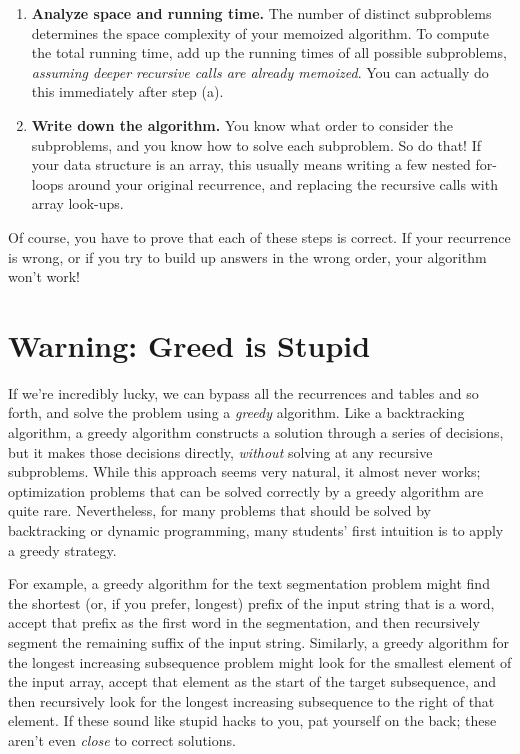 \begin{enumerate}
\begin{enumerate}
The dependencies you identified in the previous step define a partial order over the subproblems; you need to find a linear extension of that partial order.
\textbf{\textit{Be careful!}}
\item \textbf{Analyze space and running time.}
The number of distinct subproblems determines the space complexity of your memoized algorithm.
To compute the total running time, add up the running times of all possible subproblems, \textit{assuming deeper recursive calls are already memoized}.
You can actually do this immediately after step (a).
\item \textbf{Write down the algorithm.}
You know what order to consider the subproblems, and you know how to solve each subproblem.
So do that!
If your data structure is an array, this usually means writing a few nested for-loops around your original recurrence, and replacing the recursive calls with array look-ups.
\end{enumerate}
\end{enumerate}
Of course, you have to prove that each of these steps is correct.
If your recurrence is wrong, or if you try to build up answers in the wrong order, your algorithm won’t work!

\section{Warning: Greed is Stupid}
\label{sec:3.5}

If we’re incredibly lucky, we can bypass all the recurrences and tables and so forth, and solve the problem using a \textit{greedy} algorithm.
Like a backtracking algorithm, a greedy algorithm constructs a solution through a series of decisions, but it makes those decisions directly, \textit{without} solving at any recursive subproblems.
While this approach seems very natural, it almost never works; optimization problems that can be solved correctly by a greedy algorithm are quite rare.
Nevertheless, for many problems that should be solved by backtracking or dynamic programming, many students’ first intuition is to apply a greedy strategy.

For example, a greedy algorithm for the text segmentation problem might find the shortest (or, if you prefer, longest) prefix of the input string that is a word, accept that prefix as the first word in the segmentation, and then recursively segment the remaining suffix of the input string.
Similarly, a greedy algorithm for the longest increasing subsequence problem might look for the smallest element of the input array, accept that element as the start of the target subsequence, and then recursively look for the longest increasing subsequence to the right of that element.
If these sound like stupid hacks to you, pat yourself on the back; these aren’t even \textit{close} to correct solutions.

